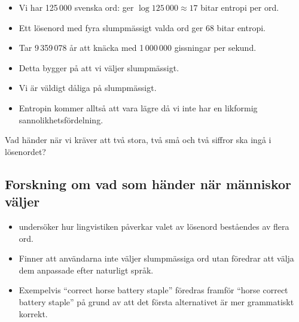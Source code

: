 \documentclass{beamer}
\begin{document}
\begin{frame}
  \begin{example}
    \begin{itemize}
      \item Vi har 125\,000 svenska ord: ger \(\log 125\,000\approx 17\) bitar 
        entropi per ord.

      \item Ett lösenord med fyra slumpmässigt valda ord ger 68 bitar entropi.

      \item Tar 9\,359\,078 år att knäcka med 1\,000\,000 gissningar per sekund.

    \end{itemize}
  \end{example}
\end{frame}

\begin{frame}
  \begin{remark}
    \begin{itemize}
      \item Detta bygger på att vi väljer slumpmässigt.

      \item Vi är väldigt dåliga på slumpmässigt.

      \item Entropin kommer alltså att vara lägre då vi inte har en likformig 
        sannolikhetsfördelning.

    \end{itemize}
  \end{remark}
\end{frame}

\begin{frame}
  \begin{remark}
    Vad händer när vi kräver att två stora, två små och två siffror ska ingå 
    i lösenordet?
  \end{remark}
\end{frame}

\subsection{Forskning om vad som händer när människor väljer}

\begin{frame}
  \begin{itemize}
    \item \citet{Bonneau2012lpo} undersöker hur lingvistiken påverkar valet av 
      lösenord beståendes av flera ord.

    \item Finner att användarna inte väljer slumpmässiga ord utan föredrar att 
      välja dem anpassade efter naturligt språk.

    \item Exempelvis \enquote{correct horse battery staple} föredras framför 
      \enquote{horse correct battery staple} på grund av att det första 
      alternativet är mer grammatiskt korrekt.

  \end{itemize}
\end{frame}
\end{document}
